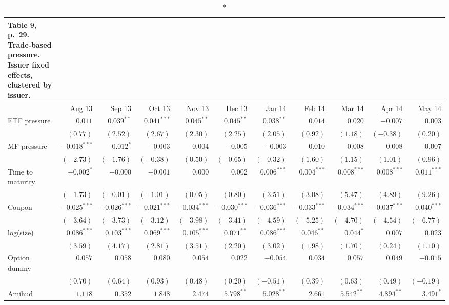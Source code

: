 \documentclass[10pt,a4paper]{article}
\begin{document}
{\scriptsize\setlength{\tabcolsep}{2pt}
\begin{longtable}{@{}l*{10}{r}@{}}
\caption*{\textbf{Table 9, p.~29. Trade-based pressure. Issuer fixed effects, clustered by issuer.}}\\
\toprule
 & Aug 13 & Sep 13 & Oct 13 & Nov 13 & Dec 13 & Jan 14 & Feb 14 & Mar 14 & Apr 14 & May 14\\
\midrule\endhead
ETF pressure & $0.011$ & $0.039^{**}$ & $0.041^{***}$ & $0.045^{**}$ & $0.045^{**}$ & $0.038^{**}$ & $0.014$ & $0.020$ & $-0.007$ & $0.003$\\
 & $(0.77)$ & $(2.52)$ & $(2.67)$ & $(2.30)$ & $(2.25)$ & $(2.05)$ & $(0.92)$ & $(1.18)$ & $(-0.38)$ & $(0.20)$\\
MF pressure & $-0.018^{***}$ & $-0.012^{*}$ & $-0.003$ & $0.004$ & $-0.005$ & $-0.003$ & $0.010$ & $0.008$ & $0.008$ & $0.007$\\
 & $(-2.73)$ & $(-1.76)$ & $(-0.38)$ & $(0.50)$ & $(-0.65)$ & $(-0.32)$ & $(1.60)$ & $(1.15)$ & $(1.01)$ & $(0.96)$\\
Time to maturity & $-0.002^{*}$ & $-0.000$ & $-0.001$ & $0.000$ & $0.002$ & $0.006^{***}$ & $0.004^{***}$ & $0.008^{***}$ & $0.008^{***}$ & $0.011^{***}$\\
 & $(-1.73)$ & $(-0.01)$ & $(-1.01)$ & $(0.05)$ & $(0.80)$ & $(3.51)$ & $(3.08)$ & $(5.47)$ & $(4.89)$ & $(9.26)$\\
Coupon & $-0.025^{***}$ & $-0.026^{***}$ & $-0.021^{***}$ & $-0.034^{***}$ & $-0.030^{***}$ & $-0.036^{***}$ & $-0.033^{***}$ & $-0.034^{***}$ & $-0.037^{***}$ & $-0.040^{***}$\\
 & $(-3.64)$ & $(-3.73)$ & $(-3.12)$ & $(-3.98)$ & $(-3.41)$ & $(-4.59)$ & $(-5.25)$ & $(-4.70)$ & $(-4.54)$ & $(-6.77)$\\
log(size) & $0.086^{***}$ & $0.103^{***}$ & $0.069^{***}$ & $0.105^{***}$ & $0.071^{**}$ & $0.086^{***}$ & $0.046^{**}$ & $0.044^{*}$ & $0.007$ & $0.023$\\
 & $(3.59)$ & $(4.17)$ & $(2.81)$ & $(3.51)$ & $(2.20)$ & $(3.02)$ & $(1.98)$ & $(1.70)$ & $(0.24)$ & $(1.10)$\\
Option dummy & $0.057$ & $0.058$ & $0.080$ & $0.054$ & $0.022$ & $-0.054$ & $0.034$ & $0.057$ & $0.049$ & $-0.015$\\
 & $(0.70)$ & $(0.64)$ & $(0.93)$ & $(0.48)$ & $(0.20)$ & $(-0.51)$ & $(0.39)$ & $(0.63)$ & $(0.49)$ & $(-0.19)$\\
Amihud & $1.118$ & $0.352$ & $1.848$ & $2.474$ & $5.798^{**}$ & $5.028^{**}$ & $2.661$ & $5.542^{**}$ & $4.894^{**}$ & $3.491^{*}$\\

\end{longtable}}
\end{document}
